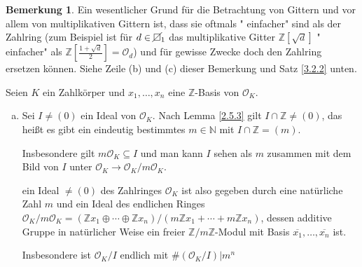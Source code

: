 \documentclass[
twoside=semi,
fontsize=12,
DIV=12, 
cleardoublepage=current,
leqno,
headings=optiontoheadandtoc, 
toc=idx
]{scrbook}
\newcommand{\N}{\mathbb{N}}
\newcommand{\Z}{\mathbb{Z}}
\newcommand{\nsquare}{\cancel{\square}}
\theoremstyle{definition}
\newtheorem{bemerkung}[definition]{Bemerkung}
\begin{document}
	\begin{bemerkung}\label{3.2.1}
		Ein wesentlicher Grund f\"ur die Betrachtung von Gittern und vor allem von multiplikativen Gittern ist, dass sie oftmals " einfacher" sind als der Zahlring (zum Beispiel ist f\"ur $d \in \nsquare_{1}$ das multiplikative Gitter $\Z[\sqrt{d}]$ " einfacher" als $\Z[\frac{1+\sqrt{d}}{2}] = \mathcal{O}_d$) und f\"ur gewisse Zwecke doch den Zahlring ersetzen k\"onnen.
		Siehe Zeile (b) und (c) dieser Bemerkung und Satz \ref{3.2.2} unten.
		
		Seien $K$ ein Zahlk\"orper und $x_1, \dots, x_n$ eine $\Z$-Basis von $\mathcal{O}_K$.
		\begin{enumerate}[(a)]
			\item Sei $I \neq (0)$ ein Ideal von $\mathcal{O}_K$. Nach Lemma \ref{2.5.3} gilt $I \cap \Z \neq (0)$, das hei\ss t es gibt ein eindeutig bestimmtes $m \in \N$ mit $I \cap \Z = (m)$.
			
			Insbesondere gilt $m \mathcal{O}_K \subseteq I$ und man kann $I$ sehen als $m$ zusammen mit dem Bild von $I$ unter $\mathcal{O}_K \to \mathcal{O}_K/m\mathcal{O}_K$.
			
			ein Ideal $\neq (0)$ des Zahlringes $\mathcal{O}_K$ ist also gegeben durch eine nat\"urliche Zahl $m$ und ein Ideal des endlichen Ringes $\mathcal{O}_K/m\mathcal{O}_K = (\Z x_1 \oplus \cdots \oplus \Z x_n) / (m\Z x_1 + \cdots + m\Z x_n)$,
			dessen additive Gruppe in nat\"urlicher Weise ein freier $\Z/m\Z$-Modul mit Basis $\overline{x_1}, \dots, \overline{x_n}$ ist.
			
			Insbesondere ist $\mathcal{O}_K /I$ endlich mit $\#(\mathcal{O}_K / I) | m^n$
		\end{enumerate}
	\end{bemerkung}
\backmatter
\printindex
\end{document}
